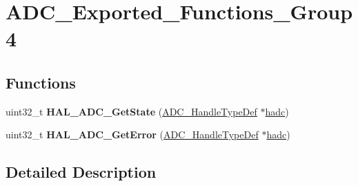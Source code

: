 \hypertarget{group___a_d_c___exported___functions___group4}{\section{A\-D\-C\-\_\-\-Exported\-\_\-\-Functions\-\_\-\-Group4}
\label{group___a_d_c___exported___functions___group4}
}
\subsection*{Functions}
\begin{DoxyCompactItemize}
\item 
\hypertarget{group___a_d_c___exported___functions___group4_ga894143f0fa1502ac0afa6eae8fdaadcc}{uint32\-\_\-t {\bfseries H\-A\-L\-\_\-\-A\-D\-C\-\_\-\-Get\-State} (\hyperlink{struct_a_d_c___handle_type_def}{A\-D\-C\-\_\-\-Handle\-Type\-Def} $\ast$\hyperlink{stm32l1xx__it_8c_a62fcafba91cf315db7e0e0c8f22c656f}{hadc})}\label{group___a_d_c___exported___functions___group4_ga894143f0fa1502ac0afa6eae8fdaadcc}

\item 
\hypertarget{group___a_d_c___exported___functions___group4_ga3a546afb96f473f266573783f37ee8af}{uint32\-\_\-t {\bfseries H\-A\-L\-\_\-\-A\-D\-C\-\_\-\-Get\-Error} (\hyperlink{struct_a_d_c___handle_type_def}{A\-D\-C\-\_\-\-Handle\-Type\-Def} $\ast$\hyperlink{stm32l1xx__it_8c_a62fcafba91cf315db7e0e0c8f22c656f}{hadc})}\label{group___a_d_c___exported___functions___group4_ga3a546afb96f473f266573783f37ee8af}

\end{DoxyCompactItemize}


\subsection{Detailed Description}
